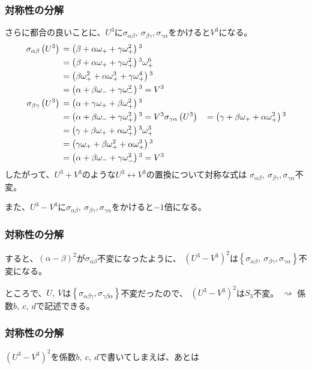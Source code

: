 \documentclass[12pt, t]{beamer}
\newcommand{\lr}[1]{\left({}#1\right){}}
\newcommand{\clr}[1]{\left\{{}#1\right\}{}}
\begin{document}
\begin{frame}
\frametitle{対称性の分解}
さらに都合の良いことに、$U^3$に$\sigma_{\alpha \beta},\ \sigma_{\beta \gamma}, \sigma_{\gamma \alpha}$をかけると$V^3$になる。
\begin{align}
  \sigma_{\alpha \beta}\lr{U^3}  &= \lr{\beta + \alpha \omega_+ + \gamma \omega_+^2}^3 \notag \\
                                 &= \lr{\beta + \alpha \omega_+ + \gamma \omega_+^2}^3 \omega_+^6 \notag \\
                                 &= \lr{\beta \omega_+^2 + \alpha \omega_+^3 + \gamma \omega_+^4}^3 \notag \\
                                 &= \lr{\alpha + \beta \omega_- + \gamma \omega_-^2}^3 = V^3 \\
  \sigma_{\beta \gamma}\lr{U^3}  &= \lr{\alpha + \gamma \omega_+ + \beta \omega_+^2}^3 \notag \\
                                 &= \lr{\alpha + \beta \omega_- + \gamma \omega_+^2}^3 = V^3
  \sigma_{\gamma \alpha}\lr{U^3} &= \lr{\gamma + \beta \omega_+ + \alpha \omega_+^2}^3 \notag \\
                                 &= \lr{\gamma + \beta \omega_+ + \alpha \omega_+^2}^3 \omega_+^3 \notag \\
                                 &= \lr{\gamma \omega_+ + \beta \omega_+^2 + \alpha \omega_+^3}^3 \notag \\
                                 &= \lr{\alpha + \beta \omega_- + \gamma \omega_-^2}^3 = V^3
\end{align}
したがって、$U^3 + V^3$のような$U^3 \leftrightarrow V^3$の置換について対称な式は
$\sigma_{\alpha \beta},\ \sigma_{\beta \gamma}, \sigma_{\gamma \alpha}$不変。

また、$U^3 - V^3$に$\sigma_{\alpha \beta},\ \sigma_{\beta \gamma}, \sigma_{\gamma \alpha}$をかけると$-1$倍になる。
\end{frame}
\begin{frame}
\frametitle{対称性の分解}
すると、$(\alpha - \beta)^2$が$\sigma_{\alpha \beta}$不変になったように、
$(U^3-V^3)^2$は$\clr{\sigma_{\alpha \beta},\ \sigma_{\beta \gamma}, \sigma_{\gamma \alpha}}$不変になる。

ところで、$U,\ V$は$\clr{\sigma_{\alpha \beta \gamma}, \sigma_{\gamma \beta \alpha}}$不変だったので、
$(U^3 - V^3)^2$は$S_3$不変。
$\rightsquigarrow$ 係数$b,\ c,\ d$で記述できる。
\end{frame}

\begin{frame}
\frametitle{対称性の分解}
$(U^3 - V^3)^2$を係数$b,\ c,\ d$で書いてしまえば、あとは
\end{frame}
\end{document}
